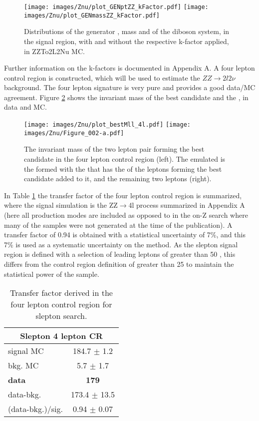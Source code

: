\begin{figure}[htbp!]
\begin{center}
\texttt{[image: images/Znu/plot\_GENptZZ\_kFactor.pdf]}
\texttt{[image: images/Znu/plot\_GENmassZZ\_kFactor.pdf]}
\caption{Distributions of the generator \pt, mass and \dphi of the diboson system, in the signal region, with and without the respective k-factor applied, in ZZTo2L2Nu MC.}
\label{kfactor}
\end{center}
\end{figure}
Further information on the k-factors is documented in Appendix A.
A four lepton control region is constructed, which will be used to estimate the $ZZ\rightarrow 2l2\nu$ background. The four lepton signature is very pure and provides a good data/MC agreement.
Figure \ref{fig:ZZslepton} shows the invariant mass of the best \PZ candidate and the \mttwo, in data and MC.
\begin{figure}[htbp!]
\begin{center}
\texttt{[image: images/Znu/plot\_bestMll\_4l.pdf]}
\texttt{[image: images/Znu/Figure\_002-a.pdf]}
\caption{The invariant mass of the two lepton pair forming the best \PZ candidate in the four lepton control region (left). The emulated \mttwo is the \mttwo formed with the \ptmiss that has the \pt of the leptons forming the best \PZ candidate added to it, and the remaining two leptons (right).}
\label{fig:ZZslepton}
\end{center}
\end{figure}
In Table \ref{tab:tab4lcontrol} the transfer factor of the four lepton control region is summarized, where the signal simulation is the ZZ$\rightarrow$4l process summarized in Appendix A (here all production modes are included as opposed to in the on-Z search where many of the samples were not generated at the time of the publication).
A transfer factor of 0.94 is obtained with a statistical uncertainty of 7\%, and this 7\% is used as a systematic uncertainty on the method. 
As the slepton signal region is defined with a selection of leading leptons of \pt greater than 50 \GeV, this differs from the control region definition of \pt greater than 25 \GeV to maintain the statistical power of the sample. 
\begin{table}[ht!]
\def\arraystretch{1.2}
\setlength{\belowcaptionskip}{6pt}
\small                
\centering                        
\caption{Transfer factor derived in the four lepton control region for slepton search.}
\label{tab:tab4lcontrol}          
\begin{tabular}{l c }
\hline \hline
\multicolumn{2}{c}{Slepton 4 lepton CR}  \\\hline
signal MC        & 184.7     $\pm$  1.2    \\
bkg. MC          & 5.7  $\pm$  1.7\\ \hline
\textbf{data}       & \textbf{179}  \\
data-bkg.        &  173.4   $\pm$  13.5 \\ \hline
(data-bkg.)/sig. & 0.94   $\pm$  0.07\\\hline\hline
\end{tabular}    
\end{table}
